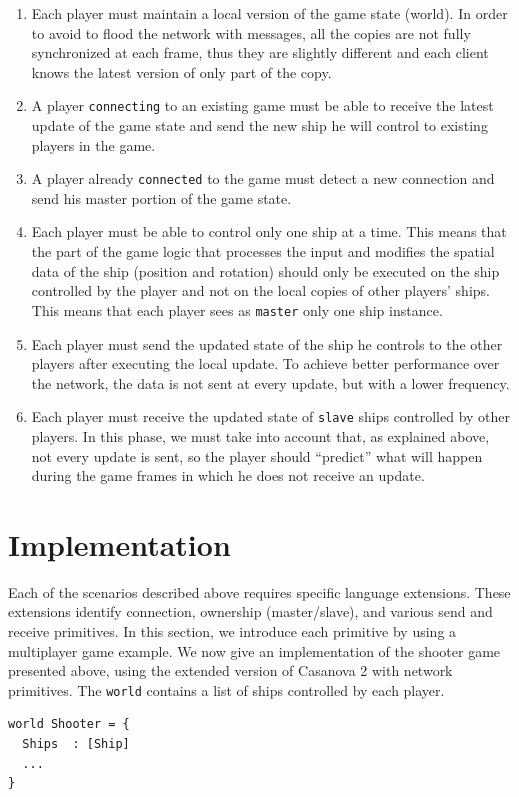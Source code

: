 \begin{enumerate}
	\item Each player must maintain a local version of the game state (world). In order to avoid to flood the network with messages, all the copies are not fully synchronized at each frame, thus they are slightly different and each client knows the latest version of only part of the copy.
	\item A player \texttt{connecting} to an existing game must be able to receive the latest update of the game state and send the new ship he will control to existing players in the game.
	\item A player already \texttt{connected} to the game must detect a new connection and send his master portion of the game state.
	\item Each player must be able to control only one ship at a time. This means that the part of the game logic that processes the input and modifies the spatial data of the ship (position and rotation) should only be executed on the ship controlled by the player and not on the local copies of other players' ships. This means that each player sees as \texttt{master} only one ship instance.
	\item Each player must send the updated state of the ship he controls to the other players after executing the local update. To achieve better performance over the network, the data is not sent at every update, but with a lower frequency.
	\item Each player must receive the updated state of \texttt{slave} ships controlled by other players. In this phase, we must take into account that, as explained above, not every update is sent, so the player should ``predict'' what will happen during the game frames in which he does not receive an update.
\end{enumerate}

\section{Implementation}
\label{sec:ch_networking_casanova_networking_primitives}
Each of the scenarios described above requires specific language extensions. These extensions identify connection, ownership (master/slave), and various send and receive primitives. In this section, we introduce each primitive by using a multiplayer game example. We now give an implementation of the shooter game presented above, using the extended version of Casanova 2 with network primitives. The \texttt{world} contains a list of ships controlled by each player.
\begin{lstlisting}
world Shooter = {
  Ships  : [Ship]
  ...
}
\end{lstlisting}

